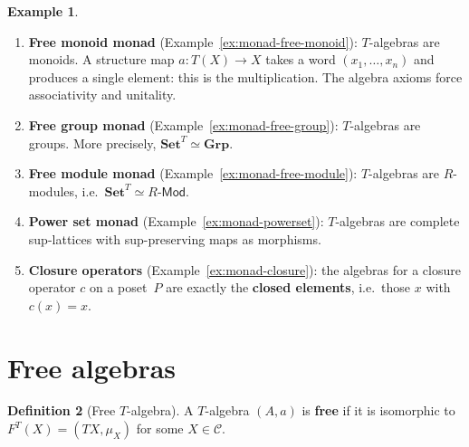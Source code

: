 \documentclass[a4paper,12pt]{book}
\newcommand{\Set}{\mathbf{Set}}
\newcommand{\Grp}{\mathbf{Grp}}
\theoremstyle{definition}
\newtheorem{definition}{Definition}[section]
\newtheorem{example}[definition]{Example}
\theoremstyle{plain}
\theoremstyle{remark}
\begin{document}
\begin{example}\label{ex:em-algebras}
\begin{enumerate}[label=(\roman*)]
\item \textbf{Free monoid monad} (Example~\ref{ex:monad-free-monoid}):
    $T$-algebras are monoids.  A structure map $a\colon T(X)\to X$
    takes a word $(x_1,\ldots,x_n)$ and produces a single element:
    this is the multiplication.  The algebra axioms force associativity
    and unitality.

\item \textbf{Free group monad} (Example~\ref{ex:monad-free-group}):
    $T$-algebras are groups.  More precisely,
    $\Set^T\simeq\Grp$.

\item \textbf{Free module monad} (Example~\ref{ex:monad-free-module}):
    $T$-algebras are $R$-modules, i.e.\ $\Set^T\simeq R\text{-}\mathsf{Mod}$.

\item \textbf{Power set monad} (Example~\ref{ex:monad-powerset}):
    $T$-algebras are complete sup-lattices with sup-preserving maps
    as morphisms.

\item \textbf{Closure operators} (Example~\ref{ex:monad-closure}):
    the algebras for a closure operator $c$ on a poset~$P$ are exactly
    the \textbf{closed elements}, i.e.\ those $x$ with $c(x) = x$.
\end{enumerate}
\end{example}


\section{Free algebras}\label{sec:free-algebras}

\begin{definition}[Free $T$-algebra]\label{def:free-algebra}
A $T$-algebra $(A,a)$ is \textbf{free} if it is isomorphic to
$F^T(X) = (TX,\mu_X)$ for some $X\in\mathcal{C}$.
\end{definition}
\end{document}
